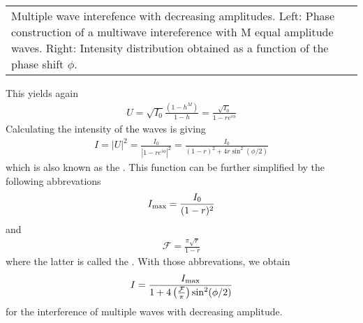 \documentclass[letterpaper,10pt,english]{sphinxmanual}
\begin{document}
\begin{savenotes}\sphinxattablestart
\centering
\begin{tabulary}{\linewidth}[t]{|T|}
\hline
\sphinxstyletheadfamily 
{}
\\
\hline
{} Multiple wave interefence with decreasing amplitudes. Left: Phase construction of a multiwave intereference with M equal amplitude waves. Right: Intensity distribution obtained as a function of the phase shift \(\phi\).
\\
\hline
\end{tabulary}
\par
\sphinxattableend\end{savenotes}

This yields again
\begin{equation*}
\begin{split}U=\sqrt{I_0}\frac{(1-h^M)}{1-h}=\frac{\sqrt{I_0}}{1-r e^{i\phi}}\end{split}
\end{equation*}
Calculating the intensity of the waves is giving
\begin{equation*}
\begin{split}I=|U|^2=\frac{I_{0}}{|1-re^{i\phi}|^2}=\frac{I_0}{(1-r)^2+4r\sin^2(\phi/2)}\end{split}
\end{equation*}
which is also known as the . This function can be further simplified by the following abbrevations
\begin{equation*}
\begin{split}I_{\rm max}=\frac{I_0}{(1-r)^2}\end{split}
\end{equation*}
and
\begin{equation*}
\begin{split}\mathcal{F}=\frac{\pi \sqrt{r}}{1-r}\end{split}
\end{equation*}
where the latter is called the . With those abbrevations, we obtain
\begin{equation*}
\begin{split}I=\frac{I_{\rm max}}{1+4\left(\frac{\mathcal{F}}{\pi}\right)\sin^{2}(\phi/2)}\end{split}
\end{equation*}
for the interference of multiple waves with decreasing amplitude.
\end{document}
